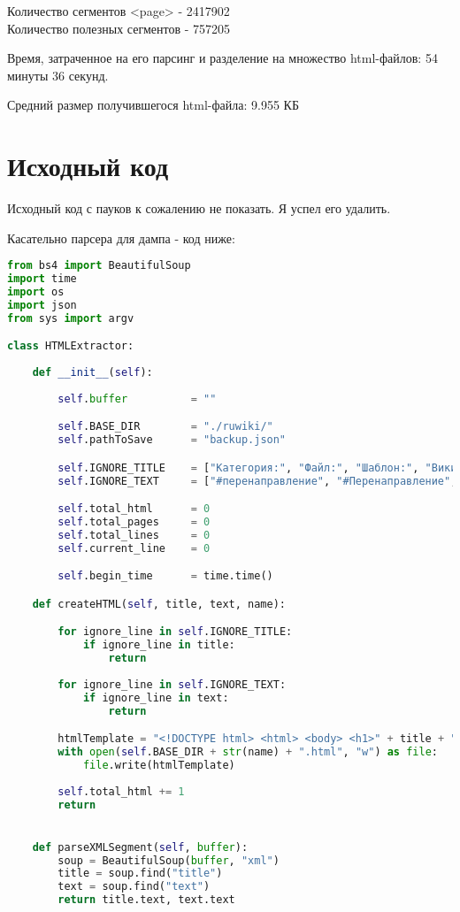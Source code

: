 Количество сегментов <page> - 2417902 \\
Количество полезных сегментов - 757205

Время, затраченное на его парсинг и разделение на множество html-файлов: 54 минуты 36 секунд.

Средний размер получившегося html-файла: 9.955 КБ
\pagebreak

\section{Исходный код}
Исходный код с пауков к сожалению не показать. Я успел его удалить.

Касательно парсера для дампа - код ниже:
\lstset{extendedchars=\true}
\begin{lstlisting}[language=Python]
from bs4 import BeautifulSoup
import time
import os
import json
from sys import argv

class HTMLExtractor:
    
    def __init__(self):
        
        self.buffer          = ""

        self.BASE_DIR        = "./ruwiki/"
        self.pathToSave      = "backup.json"

        self.IGNORE_TITLE    = ["Категория:", "Файл:", "Шаблон:", "Википедия:", "Проект:"]
        self.IGNORE_TEXT     = ["#перенаправление", "#Перенаправление", "#ПЕРЕНАПРАВЛЕНИЕ", "#REDIRECT", "#Redirect", "#redirect"]

        self.total_html      = 0
        self.total_pages     = 0
        self.total_lines     = 0
        self.current_line    = 0

        self.begin_time      = time.time()

    def createHTML(self, title, text, name):

        for ignore_line in self.IGNORE_TITLE:
            if ignore_line in title:
                return
            
        for ignore_line in self.IGNORE_TEXT:
            if ignore_line in text:
                return

        htmlTemplate = "<!DOCTYPE html> <html> <body> <h1>" + title + "</h1> <p>" + text + "</p> </body> </html>"
        with open(self.BASE_DIR + str(name) + ".html", "w") as file:
            file.write(htmlTemplate)
        
        self.total_html += 1
        return


    def parseXMLSegment(self, buffer):
        soup = BeautifulSoup(buffer, "xml")
        title = soup.find("title")
        text = soup.find("text")
        return title.text, text.text


\end{lstlisting}
